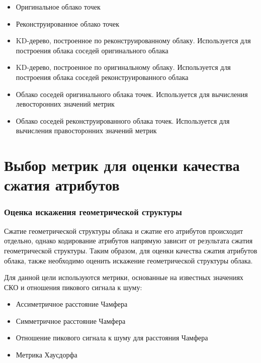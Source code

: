 \begin{itemize}
    \item Оригинальное облако точек
    \item Реконструированное облако точек
    \item KD-дерево, построенное по реконструированному облаку. Используется для
    построения облака соседей оригинального облака
    \item KD-дерево, построенное по оригинальному облаку. Используется для
    построения облака соседей реконструированного облака
    \item Облако соседей оригинального облака точек. Используется для вычисления
    левосторонних значений метрик
    \item Облако соседей реконструированного облака точек. Используется для
    вычисления правосторонних значений метрик
\end{itemize}


\section{Выбор метрик для оценки качества сжатия атрибутов}


\subsubsection{Оценка искажения геометрической структуры}

Сжатие геометрической структуры облака и сжатие его атрибутов происходит
отдельно, однако кодирование атрибутов напрямую зависит от результата сжатия
геометрической структуры. Таким образом, для оценки качества сжатия атрибутов
облака, также необходимо оценить искажение геометрической структуры облака.

Для данной цели используются метрики, основанные на известных значениях СКО и
отношения пикового сигнала к шуму\cite{Wu2020}:

\begin{itemize}
    \item Ассиметричное расстояние Чамфера
    \item Симметричное расстояние Чамфера
    \item Отношение пикового сигнала к шуму для расстояния Чамфера
    \item Метрика Хаусдорфа
\end{itemize}

